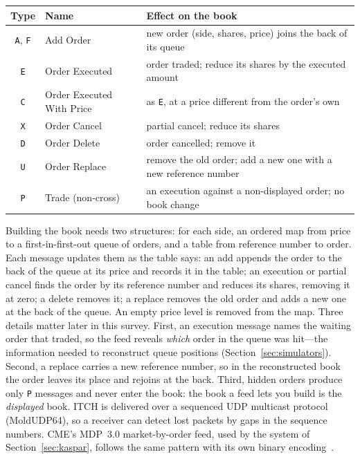 \begin{center}\footnotesize
\begin{tabular}{cll}
\toprule
Type & Name & Effect on the book \\
\midrule
\texttt{A}, \texttt{F} & Add Order & new order (side, shares, price) joins the back of its queue \\
\texttt{E} & Order Executed & order traded; reduce its shares by the executed amount \\
\texttt{C} & Order Executed With Price & as \texttt{E}, at a price different from the order's own \\
\texttt{X} & Order Cancel & partial cancel; reduce its shares \\
\texttt{D} & Order Delete & order cancelled; remove it \\
\texttt{U} & Order Replace & remove the old order; add a new one with a new reference number \\
\texttt{P} & Trade (non-cross) & an execution against a non-displayed order; no book change \\
\bottomrule
\end{tabular}
\end{center}

\noindent Building the book needs two structures: for each side, an ordered map from price to a first-in-first-out
queue of orders, and a table from reference number to order. Each message updates them as the table says: an add
appends the order to the back of the queue at its price and records it in the table; an execution or partial cancel
finds the order by its reference number and reduces its shares, removing it at zero; a delete removes it; a replace
removes the old order and adds a new one at the back of the queue. An empty price level is removed from the map.
Three details matter later in this survey. First, an execution message names the waiting order
that traded, so the feed reveals \emph{which} order in the queue was hit---the information needed
to reconstruct queue positions (Section~\ref{sec:simulators}). Second, a replace carries a new reference number, so in
the reconstructed book the order leaves its place and rejoins at the back. Third, hidden orders
produce only \texttt{P} messages and never enter the book: the book a feed lets you build is the
\emph{displayed} book. ITCH is delivered over a sequenced UDP multicast protocol (MoldUDP64), so a
receiver can detect lost packets by gaps in the sequence numbers. CME's MDP~3.0 market-by-order feed,
used by the \kasparhft{} system of Section~\ref{sec:kaspar}, follows the same pattern with its own binary
encoding~\citep{cme_mdp3}.

